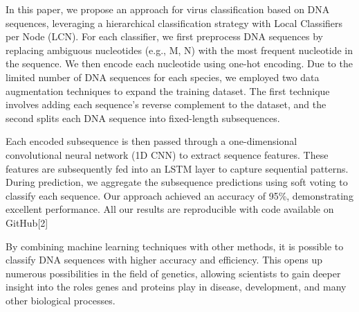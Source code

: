 In this paper, we propose an approach for virus classification based on DNA sequences, leveraging a hierarchical classification strategy with Local Classifiers per Node (LCN). For each classifier, we first preprocess DNA sequences by replacing ambiguous nucleotides (e.g., M, N) with the most frequent nucleotide in the sequence. We then encode each nucleotide using one-hot encoding. Due to the limited number of DNA sequences for each species, we employed two data augmentation techniques to expand the training dataset. The first technique involves adding each sequence's reverse complement to the dataset, and the second splits each DNA sequence into fixed-length subsequences.

Each encoded subsequence is then passed through a one-dimensional convolutional neural network (1D CNN) to extract sequence features. These features are subsequently fed into an LSTM layer to capture sequential patterns. During prediction, we aggregate the subsequence predictions using soft voting to classify each sequence. Our approach achieved an accuracy of 95\%, demonstrating excellent performance. All our results are reproducible with code available on GitHub[2]


By combining machine learning techniques with other methods, it is possible to classify DNA sequences with higher accuracy and efficiency. This opens up numerous possibilities in the field of genetics, allowing scientists to gain deeper insight into the roles genes and proteins play in disease, development, and many other biological processes.

 


